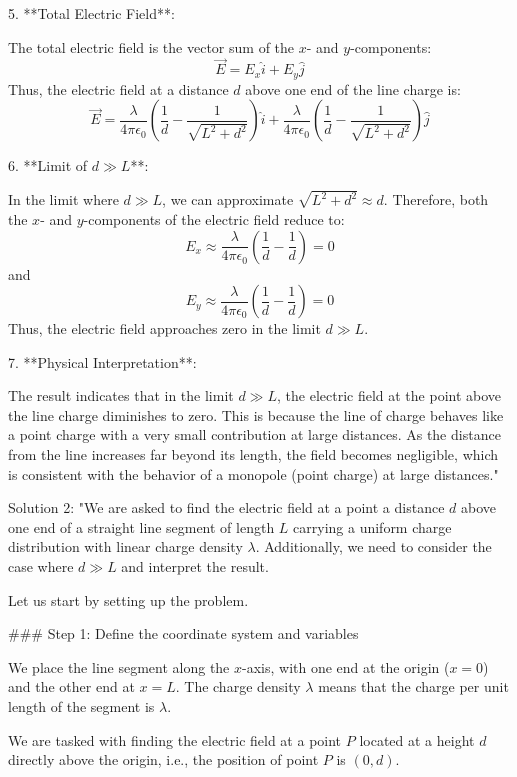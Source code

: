 5. **Total Electric Field**:

The total electric field is the vector sum of the \( x \)- and \( y \)-components:
\[
\vec{E} = E_x \hat{i} + E_y \hat{j}
\]
Thus, the electric field at a distance \( d \) above one end of the line charge is:
\[
\vec{E} = \frac{\lambda}{4 \pi \epsilon_0} \left( \frac{1}{d} - \frac{1}{\sqrt{L^2 + d^2}} \right) \hat{i} + \frac{\lambda}{4 \pi \epsilon_0} \left( \frac{1}{d} - \frac{1}{\sqrt{L^2 + d^2}} \right) \hat{j}
\]

6. **Limit of \( d \gg L \)**:

In the limit where \( d \gg L \), we can approximate \( \sqrt{L^2 + d^2} \approx d \). Therefore, both the \( x \)- and \( y \)-components of the electric field reduce to:
\[
E_x \approx \frac{\lambda}{4 \pi \epsilon_0} \left( \frac{1}{d} - \frac{1}{d} \right) = 0
\]
and
\[
E_y \approx \frac{\lambda}{4 \pi \epsilon_0} \left( \frac{1}{d} - \frac{1}{d} \right) = 0
\]
Thus, the electric field approaches zero in the limit \( d \gg L \).

7. **Physical Interpretation**:

The result indicates that in the limit \( d \gg L \), the electric field at the point above the line charge diminishes to zero. This is because the line of charge behaves like a point charge with a very small contribution at large distances. As the distance from the line increases far beyond its length, the field becomes negligible, which is consistent with the behavior of a monopole (point charge) at large distances."

Solution 2:
"We are asked to find the electric field at a point a distance \( d \) above one end of a straight line segment of length \( L \) carrying a uniform charge distribution with linear charge density \( \lambda \). Additionally, we need to consider the case where \( d \gg L \) and interpret the result.

Let us start by setting up the problem.

### Step 1: Define the coordinate system and variables

We place the line segment along the \( x \)-axis, with one end at the origin (\( x = 0 \)) and the other end at \( x = L \). The charge density \( \lambda \) means that the charge per unit length of the segment is \( \lambda \). 

We are tasked with finding the electric field at a point \( P \) located at a height \( d \) directly above the origin, i.e., the position of point \( P \) is \( (0, d) \).


